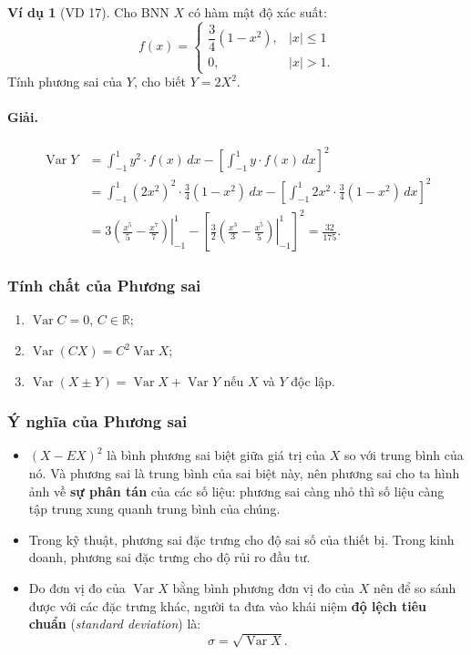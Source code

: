 \documentclass[12pt,a4paper]{article}
\theoremstyle{definition}
\newtheorem{vidu}{Ví dụ}[section]
\begin{document}
\begin{vidu}[VD 17]
Cho BNN $X$ có hàm mật độ xác suất:
\[
f(x) = \begin{cases}
\dfrac{3}{4}(1 - x^2), & |x| \le 1 \\
0, & |x| > 1.
\end{cases}
\]
Tính phương sai của $Y$, cho biết $Y = 2X^2$.

\paragraph{Giải.}
\begin{align*}
\operatorname{Var} Y &= \int_{-1}^1 y^2 \cdot f(x)\,dx - \left[\int_{-1}^1 y \cdot f(x)\,dx\right]^2 \\
&= \int_{-1}^1 (2x^2)^2 \cdot \frac{3}{4}(1 - x^2)\,dx - \left[\int_{-1}^1 2x^2 \cdot \frac{3}{4}(1 - x^2)\,dx\right]^2 \\
&= 3\left.\left(\frac{x^5}{5} - \frac{x^7}{7}\right)\right|_{-1}^1 - \left[\frac{3}{2}\left.\left(\frac{x^3}{3} - \frac{x^5}{5}\right)\right|_{-1}^1\right]^2 = \frac{32}{175}.
\end{align*}
\end{vidu}

\subsubsection{Tính chất của Phương sai}
\begin{enumerate}[label=\arabic*)]
    \item $\operatorname{Var} C = 0$, $C \in \mathbb{R}$;
    \item $\operatorname{Var}(CX) = C^2 \operatorname{Var} X$;
    \item $\operatorname{Var}(X \pm Y) = \operatorname{Var} X + \operatorname{Var} Y$ nếu $X$ và $Y$ độc lập.
\end{enumerate}

\subsubsection{Ý nghĩa của Phương sai}
\begin{itemize}
    \item $(X - EX)^2$ là bình phương sai biệt giữa giá trị của $X$ so với trung bình của nó. Và phương sai là trung bình của sai biệt này, nên phương sai cho ta hình ảnh về \textbf{sự phân tán} của các số liệu: phương sai càng nhỏ thì số liệu càng tập trung xung quanh trung bình của chúng.
    \item Trong kỹ thuật, phương sai đặc trưng cho độ sai số của thiết bị. Trong kinh doanh, phương sai đặc trưng cho độ rủi ro đầu tư.
    \item Do đơn vị đo của $\operatorname{Var} X$ bằng bình phương đơn vị đo của $X$ nên để so sánh được với các đặc trưng khác, người ta đưa vào khái niệm \textbf{độ lệch tiêu chuẩn} (\textit{standard deviation}) là:
    \[
    \sigma = \sqrt{\operatorname{Var} X}.
    \]
\end{itemize}
\end{document}
